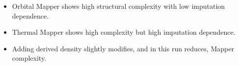 \begin{itemize}
\item Orbital Mapper shows high structural complexity with low imputation dependence.
\item Thermal Mapper shows high complexity but high imputation dependence.
\item Adding derived density slightly modifies, and in this run reduces, Mapper complexity.
\end{itemize}

